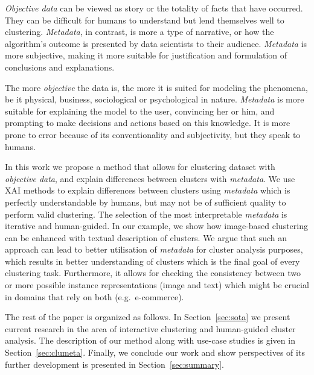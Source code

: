 \documentclass[
 twocolumn,
 hf,
]{ceurart}
\begin{document}
\textit{Objective data} can be viewed as story or the totality of facts that have occurred.
They can be difficult for humans to understand but lend themselves well to clustering.
\textit{Metadata}, in contrast, is more a type of narrative, or how the algorithm's outcome is presented by data scientists to their audience.
\textit{Metadata} is more subjective, making it more suitable for justification and formulation of conclusions and explanations.

The more \textit{objective} the data is, the more it is suited for modeling the phenomena, be it physical, business, sociological or psychological in nature.
\textit{Metadata} is more suitable for explaining the model to the user, convincing her or him, and prompting to make decisions and actions based on this knowledge.
It is more prone to error because of its conventionality and subjectivity, but they speak to humans.

In this work we propose a method that allows for clustering dataset with \textit{objective data}, and explain differences between clusters with \textit{metadata}.
We use XAI methods to explain differences between clusters using \textit{metadata} which is perfectly understandable by humans, but may not be of sufficient quality to perform valid clustering.
The selection of the most interpretable \textit{metadata} is iterative and human-guided.
In our example, we show how image-based clustering can be enhanced with textual description of clusters.
We argue that such an approach can lead to better utilisation of \textit{metadata} for cluster analysis purposes, which results in better understanding of clusters which is the final goal of every clustering task. %
Furthermore, it allows for checking the consistency between two or more possible instance representations (image and text) which might be crucial in domains that rely on both (e.g.\ e-commerce).

The rest of the paper is organized as follows.
In Section~\ref{sec:sota} we present current research in the area of interactive clustering and human-guided cluster analysis.
The description of our method along with use-case studies is given in Section~\ref{sec:clumeta}.
Finally, we conclude our work and show perspectives of its further development is presented in Section~\ref{sec:summary}.
\end{document}
